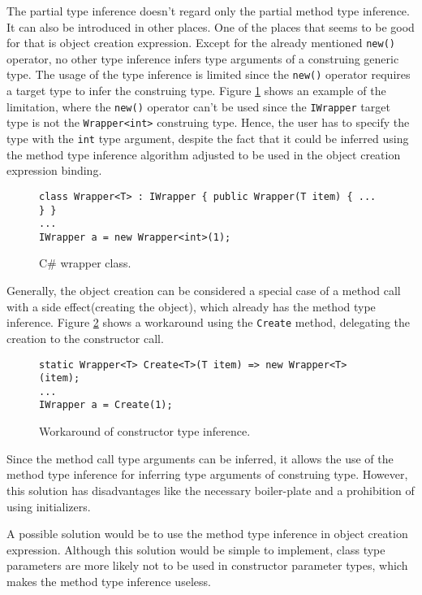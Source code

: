 The partial type inference doesn’t regard only the partial method type inference. 
It can also be introduced in other places. One of the places that seems to be good for that is object creation expression. 
Except for the already mentioned \texttt{new()} operator, no other type inference infers type arguments of a construing generic type. The usage of the type inference is limited since the \texttt{new()} operator requires a target type to infer the construing type. 
Figure \ref{img34:wrapper} shows an example of the limitation, where the \texttt{new()} operator can’t be used since the \texttt{IWrapper} target type is not the \texttt{Wrapper<int>} construing type. 
Hence, the user has to specify the type with the \texttt{int} type argument, despite the fact that it could be inferred using the method type inference algorithm adjusted to be used in the object creation expression binding.
\begin{figure}[h]
\begin{lstlisting}[style=csharp]
class Wrapper<T> : IWrapper { public Wrapper(T item) { ... } }
...
IWrapper a = new Wrapper<int>(1);
\end{lstlisting}
\caption{C\# wrapper class.}
\label{img34:wrapper}
\end{figure}
\par
Generally, the object creation can be considered a special case of a method call with a side effect(creating the object), which already has the method type inference. 
Figure \ref{img35:workaroung} shows a workaround using the \texttt{Create} method, delegating the creation to the constructor call. 
\begin{figure}[h!]
\begin{lstlisting}[style=csharp]
static Wrapper<T> Create<T>(T item) => new Wrapper<T>(item);
...
IWrapper a = Create(1);
\end{lstlisting}
\caption{Workaround of constructor type inference.}
\label{img35:workaroung}
\end{figure}
Since the method call type arguments can be inferred, it allows the use of the method type inference for inferring type arguments of construing type. 
However, this solution has disadvantages like the necessary boiler-plate and a prohibition of using initializers.
\par
A possible solution would be to use the method type inference in object creation expression. 
Although this solution would be simple to implement, class type parameters are more likely not to be used in constructor parameter types, which makes the method type inference useless. 
